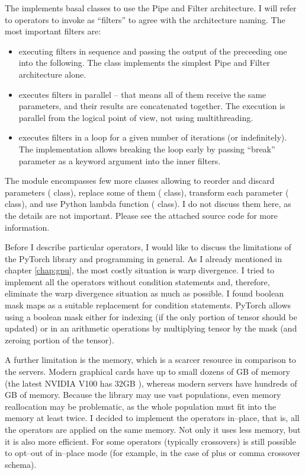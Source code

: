 The  implements basal classes to use the Pipe and Filter architecture. I will refer to operators to invoke as \enquote{filters} to agree with the architecture naming. The most important filters are:
\begin{itemize}
    \item {} executing filters in sequence and passing the output of the preceeding one into the following. The  class implements the simplest Pipe and Filter architecture alone.
    \item {} executes filters in parallel -- that means all of them receive the same parameters, and their results are concatenated together. The execution is parallel from the logical point of view, not using multithreading.
    \item {} executes filters in a loop for a given number of iterations (or indefinitely). The implementation allows breaking the loop early by passing \enquote{break} parameter as a keyword argument into the inner filters.
\end{itemize}
The module encompasses few more classes allowing to reorder and discard parameters ( class), replace some of them ( class), transform each parameter ( class), and use Python lambda function ( class). I do not discuss them here, as the details are not important. Please see the attached source code for more information.

Before I describe particular operators, I would like to discuss the limitations of the PyTorch library and \gpu programming in general. As I already mentioned in chapter \ref{chap:gpu}, the most costly situation is warp divergence. I tried to implement all the operators without condition statements and, therefore, eliminate the warp divergence situation as much as possible. I found boolean mask maps as a suitable replacement for condition statements. PyTorch allows using a boolean mask either for indexing (if the only portion of tensor should be updated) or in an arithmetic operations by multiplying tensor by the mask (and zeroing portion of the tensor).

A further limitation is the \gpu memory, which is a scarcer resource in comparison to the servers. Modern graphical cards have up to small dozens of GB of memory (the latest NVIDIA V100 has 32GB \citep{nvidiav100spec}), whereas modern servers have hundreds of GB of memory. Because the library may use vast populations, even memory reallocation may be problematic, as the whole population must fit into the memory at least twice. I decided to implement the operators in--place, that is, all the operators are applied on the same memory. Not only it uses less memory, but it is also more efficient. For some operators (typically crossovers) is still possible to opt--out of in--place mode (for example, in the case of plus or comma crossover schema).

